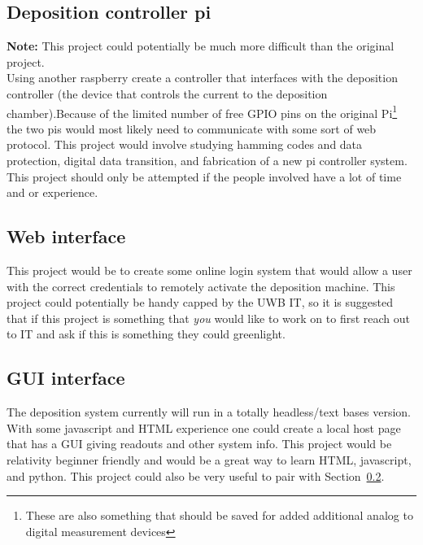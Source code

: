 \documentclass[titlepage]{article}
\begin{document}
\subsection{Deposition controller pi}
\label{section:depcon}
\textbf{Note:} This project could potentially be much more difficult than the original project.\\
Using another raspberry create a controller that interfaces with the deposition controller (the device that controls the current to the deposition chamber).Because of the limited number of free GPIO pins on the original Pi\footnote{These are also something that should be saved for added additional analog to digital measurement devices} the two pis would most likely need to communicate with some sort of web protocol. This project would involve studying hamming codes and data protection, digital data transition, and fabrication of a new pi controller system. This project should only be attempted if the people involved have a lot of time and or experience.

\subsection{Web interface}
\label{section:web-interface}
This project would be to create some online login system that would allow a user with the correct credentials to remotely activate the deposition machine. This project could potentially be handy capped by the UWB IT, so it is suggested that if this project is something that \textit{you} would like to work on to first reach out to IT and ask if this is something they could greenlight.

\subsection{GUI interface}
\label{section:GUI}
The deposition system currently will run in a totally headless/text bases version. With some javascript and HTML experience one could create a local host page that has a GUI giving readouts and other system info. This project would be relativity beginner friendly and would be a great way to learn HTML, javascript, and python. This project could also be very useful to pair with Section~\ref{section:web-interface}.
\end{document}
